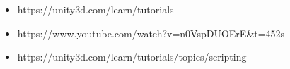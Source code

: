 \documentclass[12pt, a4paper]{article}
\begin{document}


\newpage
{}

\newpage

\newpage

\newpage

\newpage

\newpage

\newpage

\newpage

\newpage

\newpage

\newpage


%

\begin{itemize}
	\item https://unity3d.com/learn/tutorials
	
	\item https://www.youtube.com/watch?v=n0VspDUOErE\&t=452s
	
	\item https://unity3d.com/learn/tutorials/topics/scripting
	
\end{itemize}
\end{document}

